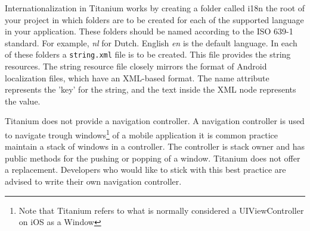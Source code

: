 
Internationalization in Titanium works by creating a folder called i18n the root of your project in which folders are to be created for each of the supported language in your application. These folders should be named according to the  ISO 639-1 standard. For example, \emph{nl} for Dutch. English \emph{en} is the default language. In each of these folders a \texttt{string.xml} file is to be created. This file provides the string resources. The string resource file closely mirrors the format of Android localization files, which have an XML-based format. The name attribute represents the 'key' for the string, and the text inside the XML node represents the value. %

Titanium does not provide a navigation controller. A navigation controller is used to navigate trough windows\footnote{Note that Titanium refers to what is normally considered a UIViewController on iOS as a Window} of a mobile application it is common practice maintain a stack of windows in a controller. The controller is stack owner and has public methods for the pushing or popping of a window. 
Titanium does not offer a replacement. Developers who would like to stick with this best practice are advised to write their own navigation controller. %


